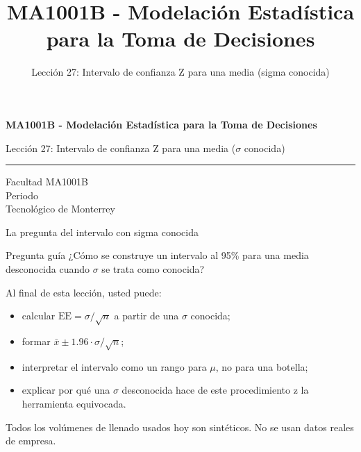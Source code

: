 \documentclass[aspectratio=169,10pt,spanish]{beamer}
\title{MA1001B - Modelación Estadística para la Toma de Decisiones}
\subtitle{Lección 27: Intervalo de confianza Z para una media (sigma conocida)}
\author{}
\institute{Tecnol\'ogico de Monterrey}
\date{}
\begin{document}
\begin{frame}[plain]
  \vspace{1.2cm}
  {\Large\bfseries MA1001B - Modelación Estadística para la Toma de Decisiones\par}
  \vspace{0.7cm}
  {\large Lección 27: Intervalo de confianza Z para una media ($\sigma$ conocida)\par}
  \vspace{0.7cm}
  {\color{TecRojo}\rule{\textwidth}{1.2pt}}
  \vspace{0.8cm}

  Facultad MA1001B\\[0.3cm]
  Periodo\\[0.3cm]
  Tecnol\'ogico de Monterrey
\end{frame}

\begin{frame}{La pregunta del intervalo con sigma conocida}
  \begin{alertblock}{Pregunta guía}
    ¿Cómo se construye un intervalo al 95\% para una media desconocida
    cuando $\sigma$ se trata como conocida?
  \end{alertblock}

  \vspace{0.6em}
  Al final de esta lección, usted puede:
  \begin{itemize}
    \item calcular $\mathrm{EE}=\sigma/\sqrt{n}$ a partir de una $\sigma$ conocida;
    \item formar $\bar{x}\pm 1.96\cdot\sigma/\sqrt{n}$;
    \item interpretar el intervalo como un rango para $\mu$, no para una botella;
    \item explicar por qué una $\sigma$ desconocida hace de este procedimiento z la herramienta equivocada.
  \end{itemize}

  \vfill
  \scriptsize Todos los volúmenes de llenado usados hoy son sintéticos. No se usan datos reales de empresa.
\end{frame}
\end{document}

